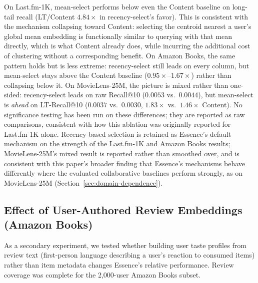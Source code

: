 \documentclass[11pt,a4paper]{article}
\begin{document}
On Last.fm-1K, mean-select performs below even the Content baseline on
long-tail recall (LT/Content $4.84\times$ in recency-select's favor).
This is consistent with the mechanism collapsing toward Content: selecting
the centroid nearest a user's global mean embedding is functionally similar
to querying with that mean directly, which is what Content already does,
while incurring the additional cost of clustering without a corresponding
benefit. On Amazon Books, the
same pattern holds but is less extreme: recency-select still leads on
every column, but mean-select stays above the Content baseline
($0.95\times$--$1.67\times$) rather than collapsing below it. On
MovieLens-25M, the picture is mixed rather than one-sided: recency-select
leads on raw Recall@10 ($0.0053$ vs.\ $0.0044$), but mean-select is
\emph{ahead} on LT-Recall@10 ($0.0037$ vs.\ $0.0030$, $1.83\times$ vs.\
$1.46\times$ Content). No significance testing has been run on these
differences; they are reported as raw comparisons, consistent with how
this ablation was originally reported for Last.fm-1K alone. Recency-based
selection is retained as Essence's default mechanism on the strength of
the Last.fm-1K and Amazon Books results; MovieLens-25M's mixed result is
reported rather than smoothed over, and is consistent with this paper's
broader finding that Essence's mechanisms behave differently where the
evaluated collaborative baselines perform strongly, as on MovieLens-25M
(Section~\ref{sec:domain-dependence}).

\subsection{Effect of User-Authored Review Embeddings (Amazon Books)}
\label{sec:pass2}

As a secondary experiment, we tested whether building user taste profiles
from review text (first-person language describing a user's reaction to
consumed items) rather than item metadata changes Essence's relative
performance. Review coverage was complete for the 2{,}000-user Amazon Books
subset.
\end{document}
